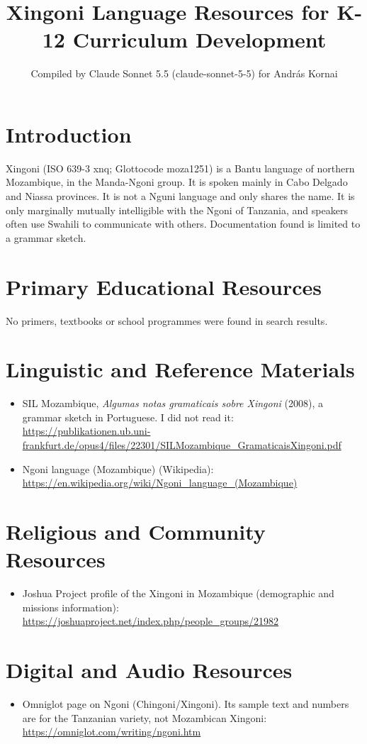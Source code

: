\documentclass[12pt]{article}
\title{Xingoni Language Resources for K-12 Curriculum Development}
\author{Compiled by Claude Sonnet 5.5 (claude-sonnet-5-5) for Andr\'as Kornai}
\date{}
\begin{document}
\maketitle

\section{Introduction}
Xingoni (ISO 639-3 xnq; Glottocode moza1251) is a Bantu language of northern Mozambique, in the Manda-Ngoni group. It is spoken mainly in Cabo Delgado and Niassa provinces. It is not a Nguni language and only shares the name. It is only marginally mutually intelligible with the Ngoni of Tanzania, and speakers often use Swahili to communicate with others. Documentation found is limited to a grammar sketch.

\section{Primary Educational Resources}
No primers, textbooks or school programmes were found in search results.

\section{Linguistic and Reference Materials}
\begin{itemize}
\item SIL Mozambique, \emph{Algumas notas gramaticais sobre Xingoni} (2008), a grammar sketch in Portuguese. I did not read it: \url{https://publikationen.ub.uni-frankfurt.de/opus4/files/22301/SILMozambique_GramaticaisXingoni.pdf}
\item Ngoni language (Mozambique) (Wikipedia): \url{https://en.wikipedia.org/wiki/Ngoni_language_(Mozambique)}
\end{itemize}

\section{Religious and Community Resources}
\begin{itemize}
\item Joshua Project profile of the Xingoni in Mozambique (demographic and missions information): \url{https://joshuaproject.net/index.php/people_groups/21982}
\end{itemize}

\section{Digital and Audio Resources}
\begin{itemize}
\item Omniglot page on Ngoni (Chingoni/Xingoni). Its sample text and numbers are for the Tanzanian variety, not Mozambican Xingoni: \url{https://omniglot.com/writing/ngoni.htm}
\end{itemize}
\end{document}
